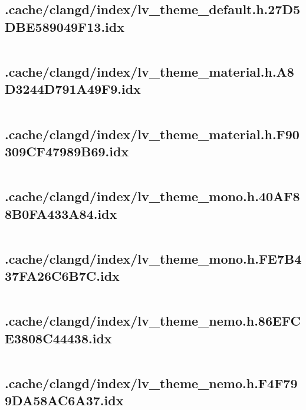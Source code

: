 \subsection{.cache/clangd/index/lv_theme_default.h.27D5DBE589049F13.idx}
\inputminted[linenos,tabsize=2,breaklines, breakanywhere]{c}{lv_theme_default.h.27D5DBE589049F13.idx}
\pagebreak

\subsection{.cache/clangd/index/lv_theme_material.h.A8D3244D791A49F9.idx}
\inputminted[linenos,tabsize=2,breaklines, breakanywhere]{c}{lv_theme_material.h.A8D3244D791A49F9.idx}
\pagebreak

\subsection{.cache/clangd/index/lv_theme_material.h.F90309CF47989B69.idx}
\inputminted[linenos,tabsize=2,breaklines, breakanywhere]{c}{lv_theme_material.h.F90309CF47989B69.idx}
\pagebreak

\subsection{.cache/clangd/index/lv_theme_mono.h.40AF88B0FA433A84.idx}
\inputminted[linenos,tabsize=2,breaklines, breakanywhere]{c}{lv_theme_mono.h.40AF88B0FA433A84.idx}
\pagebreak

\subsection{.cache/clangd/index/lv_theme_mono.h.FE7B437FA26C6B7C.idx}
\inputminted[linenos,tabsize=2,breaklines, breakanywhere]{c}{lv_theme_mono.h.FE7B437FA26C6B7C.idx}
\pagebreak

\subsection{.cache/clangd/index/lv_theme_nemo.h.86EFCE3808C44438.idx}
\inputminted[linenos,tabsize=2,breaklines, breakanywhere]{c}{lv_theme_nemo.h.86EFCE3808C44438.idx}
\pagebreak

\subsection{.cache/clangd/index/lv_theme_nemo.h.F4F799DA58AC6A37.idx}
\inputminted[linenos,tabsize=2,breaklines, breakanywhere]{c}{lv_theme_nemo.h.F4F799DA58AC6A37.idx}
\pagebreak

